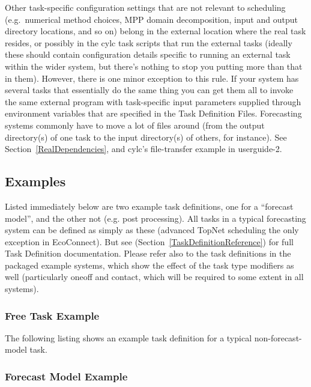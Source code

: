 \documentclass[11pt,a4paper]{article}
\begin{document}
Other task-specific configuration settings that are not relevant to
scheduling (e.g.\ numerical method choices, MPP
domain decomposition, input and output directory locations, and so on)
belong in the external location where the real task resides, or possibly
in the cylc task scripts that run the external tasks (ideally these
should contain configuration details specific to running an external
task within the wider system, but there's nothing to stop you putting
more than that in them). However, there is one minor exception to this
rule. If your system has several tasks that essentially do the same
thing you can get them all to invoke the same external program with
task-specific input parameters supplied through environment variables
that are specified in the Task Definition Files. Forecasting systems
commonly have to move a lot of files around (from the output
directory(s) of one task to the input directory(s) of others, for
instance). See Section~\ref{RealDependencies}, and cylc's file-transfer
example in userguide-2. 

\subsection{Examples}

Listed immediately below are two example task definitions, one for a
``forecast model'', and the other not (e.g. post processing). All tasks
in a typical forecasting system can be defined as simply as these
(advanced TopNet scheduling the only exception in EcoConnect). 
But see (Section~\ref{TaskDefinitionReference}) for full Task Definition
documentation. Please refer also to the task definitions in the packaged
example systems, which show the effect of the task type modifiers as well
(particularly oneoff and contact, which will be required to some extent
in all systems).


\subsubsection{Free Task Example}

The following listing shows an example task definition for a
typical non-forecast-model task.
\lstset{language=cylctaskdef}

{

}

\subsubsection{Forecast Model Example}
\end{document}
